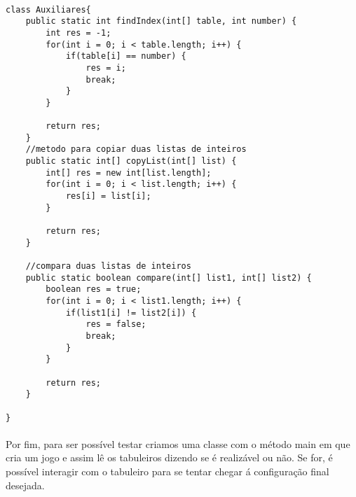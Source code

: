 \documentclass[12pt]{article}
\begin{document}
\paragraph{}
\begin{lstlisting}[frame=single]
class Auxiliares{
    public static int findIndex(int[] table, int number) {
        int res = -1;
        for(int i = 0; i < table.length; i++) {
            if(table[i] == number) {
                res = i;
                break;
            }
        }

        return res;
    }
    //metodo para copiar duas listas de inteiros
    public static int[] copyList(int[] list) {
        int[] res = new int[list.length];
        for(int i = 0; i < list.length; i++) {
            res[i] = list[i];
        }

        return res;
    }

    //compara duas listas de inteiros
    public static boolean compare(int[] list1, int[] list2) {
        boolean res = true;
        for(int i = 0; i < list1.length; i++) {
            if(list1[i] != list2[i]) {
                res = false;
                break;
            }
        }

        return res;
    }

}

\end{lstlisting}
\paragraph{}
Por fim, para ser possível testar criamos uma classe com o método main em que cria um jogo e assim lê os tabuleiros dizendo se é realizável ou não. Se for, é possível interagir com o tabuleiro para se tentar chegar á configuração final desejada.
\end{document}
